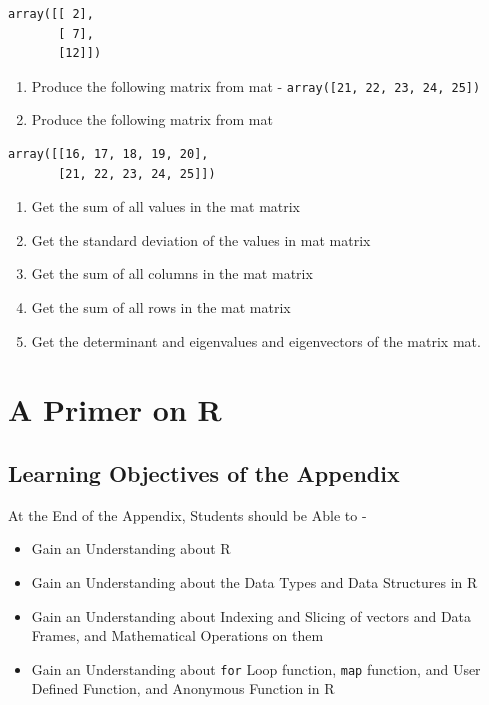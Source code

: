 \documentclass[
  letterpaper,
  DIV=11,
  numbers=noendperiod]{scrreprt}
\begin{document}
\begin{verbatim}
array([[ 2],
       [ 7],
       [12]])
\end{verbatim}

\begin{enumerate}
\def\labelenumi{\arabic{enumi}.}
\setcounter{enumi}{13}
\item
  Produce the following matrix from mat -
  \texttt{array({[}21,\ 22,\ 23,\ 24,\ 25{]})}
\item
  Produce the following matrix from mat
\end{enumerate}

\begin{verbatim}
array([[16, 17, 18, 19, 20],
       [21, 22, 23, 24, 25]])
\end{verbatim}

\begin{enumerate}
\def\labelenumi{\arabic{enumi}.}
\setcounter{enumi}{15}
\item
  Get the sum of all values in the mat matrix
\item
  Get the standard deviation of the values in mat matrix
\item
  Get the sum of all columns in the mat matrix
\item
  Get the sum of all rows in the mat matrix
\item
  Get the determinant and eigenvalues and eigenvectors of the matrix
  mat.
\end{enumerate}

\chapter{A Primer on R}\label{a-primer-on-r}

\section*{Learning Objectives of the
Appendix}\label{learning-objectives-of-the-appendix-1}


At the End of the Appendix, Students should be Able to -

\begin{itemize}
\item
  Gain an Understanding about R
\item
  Gain an Understanding about the Data Types and Data Structures in R
\item
  Gain an Understanding about Indexing and Slicing of vectors and Data
  Frames, and Mathematical Operations on them
\item
  Gain an Understanding about \texttt{for} Loop function, \texttt{map}
  function, and User Defined Function, and Anonymous Function in R
\end{itemize}
\end{document}
